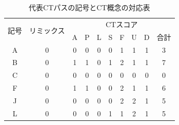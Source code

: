 \documentclass[11pt,dvipdfmx]{jreport}
\begin{document}
\begin{table}[h]
\begin{minipage}[t]{0.55\linewidth}
    \centering
    \caption{代表CTパスの記号とCT概念の対応表}
    \label{tab:dict-btod}
    \vspace{8mm}
      \begin{tabular}{c|c|cccccccc}
\hline
\multirow{2}{*}{記号} & \multicolumn{1}{l|}{\multirow{2}{*}{\small{リミックス}}} & \multicolumn{8}{c}{CTスコア}                                                                                                                                                         \\ \cline{3-10} 
                    & \multicolumn{1}{l|}{}                       & \multicolumn{1}{c|}{A} & \multicolumn{1}{c|}{P} & \multicolumn{1}{c|}{L} & \multicolumn{1}{c|}{S} & \multicolumn{1}{c|}{F} & \multicolumn{1}{c|}{U} & \multicolumn{1}{c|}{D} & 合計 \\ \hline \hline
A                   & 0                                           & \multicolumn{1}{c|}{0} & \multicolumn{1}{c|}{0} & \multicolumn{1}{c|}{0} & \multicolumn{1}{c|}{0} & \multicolumn{1}{c|}{1} & \multicolumn{1}{c|}{1} & \multicolumn{1}{c|}{1} & 3  \\ \hline
B                   & 0                                           & \multicolumn{1}{c|}{1} & \multicolumn{1}{c|}{1} & \multicolumn{1}{c|}{0} & \multicolumn{1}{c|}{1} & \multicolumn{1}{c|}{2} & \multicolumn{1}{c|}{1} & \multicolumn{1}{c|}{1} & 7  \\ \hline
C                   & 0                                           & \multicolumn{1}{c|}{0} & \multicolumn{1}{c|}{0} & \multicolumn{1}{c|}{0} & \multicolumn{1}{c|}{0} & \multicolumn{1}{c|}{0} & \multicolumn{1}{c|}{0} & \multicolumn{1}{c|}{0} & 0  \\ \hline
F                   & 0                                           & \multicolumn{1}{c|}{1} & \multicolumn{1}{c|}{1} & \multicolumn{1}{c|}{0} & \multicolumn{1}{c|}{0} & \multicolumn{1}{c|}{2} & \multicolumn{1}{c|}{1} & \multicolumn{1}{c|}{1} & 6  \\ \hline
J                   & 0                                           & \multicolumn{1}{c|}{0} & \multicolumn{1}{c|}{0} & \multicolumn{1}{c|}{0} & \multicolumn{1}{c|}{0} & \multicolumn{1}{c|}{2} & \multicolumn{1}{c|}{2} & \multicolumn{1}{c|}{1} & 5  \\ \hline
L                   & 0                                           & \multicolumn{1}{c|}{0} & \multicolumn{1}{c|}{0} & \multicolumn{1}{c|}{0} & \multicolumn{1}{c|}{1} & \multicolumn{1}{c|}{1} & \multicolumn{1}{c|}{2} & \multicolumn{1}{c|}{1} & 5  \\ \hline

\end{tabular}
\end{minipage}
\end{table}
\end{document}
